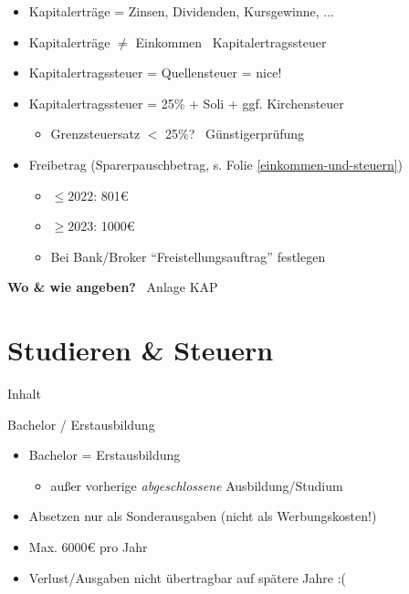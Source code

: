 \documentclass{beamer}
\begin{document}
			\begin{frame}
				\begin{itemize}
					\item Kapitalerträge = Zinsen, Dividenden, Kursgewinne, ...
					\item Kapitalerträge $\neq$ Einkommen \textrightarrow\ Kapitalertragssteuer\pause
					\item Kapitalertragssteuer = Quellensteuer = nice!
					\item Kapitalertragssteuer = 25\% + Soli + ggf. Kirchensteuer
					\begin{itemize}
						\item Grenzsteuersatz $<$ 25\%? \textrightarrow\ Günstigerprüfung
					\end{itemize}\pause
					\item Freibetrag (Sparerpauschbetrag, s. Folie \ref{einkommen-und-steuern})
					\begin{itemize}
						\item $\leq2022$: 801€
						\item $\geq2023$: 1000€
						\item Bei Bank/Broker "`Freistellungsauftrag"' festlegen
					\end{itemize}
				\end{itemize}\n
				\pause
				\textbf{Wo \& wie angeben?} \textrightarrow\ Anlage KAP
			\end{frame}
		
	\section{Studieren \& Steuern}
	
		\begin{frame}[t]{Inhalt}
		\end{frame}
	
		\begin{frame}{Bachelor / Erstausbildung}
			\begin{itemize}
				\item Bachelor = Erstausbildung
				\begin{itemize}
					\item außer vorherige \textit{abgeschlossene} Ausbildung/Studium
				\end{itemize}
				\item Absetzen nur als Sonderausgaben (nicht als Werbungskosten!)
				\item Max. 6000€ pro Jahr
				\item Verlust/Ausgaben nicht übertragbar auf spätere Jahre :(
			\end{itemize}
		\end{frame}
	
\end{document}
